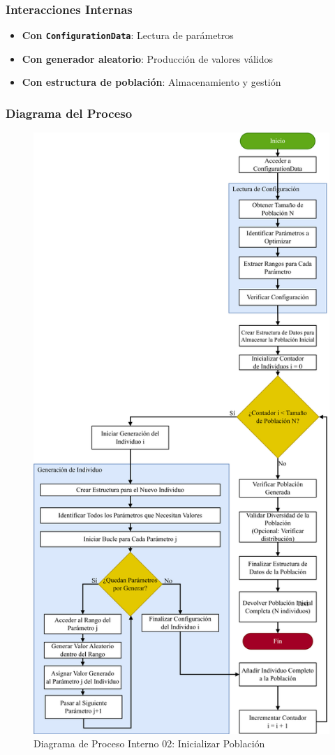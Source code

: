 \subsubsection{Interacciones Internas}
\begin{itemize}
    \item \textbf{Con \texttt{ConfigurationData}}: Lectura de parámetros
    \item \textbf{Con generador aleatorio}: Producción de valores válidos
    \item \textbf{Con estructura de población}: Almacenamiento y gestión
\end{itemize}

\subsubsection{Diagrama del Proceso}
\begin{figure}[H]
    \centering
    \includegraphics[width=\textwidth]{img/Analisis/DiagramaProcesos/DiagramaProceso02_InicializarPoblacion.png}
    \caption{Diagrama de Proceso Interno 02: Inicializar Población}%
    \label{fig:process_diagram02}
\end{figure}
